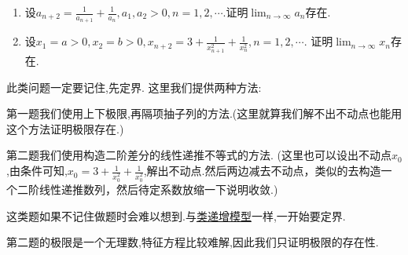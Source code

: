 \documentclass[../../main.tex]{subfiles}
\begin{document}
\begin{example}[类递减模型]\label{example:类递减模型}
\begin{enumerate}
\item 设\(a_{n + 2} = \frac{1}{a_{n + 1}} + \frac{1}{a_{n}}, a_{1}, a_{2} > 0, n = 1,2,\cdots\).证明\(\lim_{n \to \infty} a_{n}\)存在.

\item 设\(x_{1} = a>0, x_{2} = b>0, x_{n + 2} = 3 + \frac{1}{x_{n + 1}^{2}} + \frac{1}{x_{n}^{2}}, n = 1,2,\cdots\).
证明\(\lim_{n \to \infty} x_{n}\)存在.
\end{enumerate}   
\end{example}
\begin{note}
此类问题一定要记住,先定界.
这里我们提供两种方法:

第一题我们使用上下极限,再隔项抽子列的方法.(这里就算我们解不出不动点也能用这个方法证明极限存在.)

第二题我们使用构造二阶差分的线性递推不等式的方法.
(这里也可以设出不动点$x_0$,由条件可知,$x_0=3+\frac{1}{x_0^2}+\frac{1}{x_0^2}$,解出不动点.然后两边减去不动点，类似的去构造一个二阶线性递推数列，然后待定系数放缩一下说明收敛.)

这类题如果不记住做题时会难以想到.与\hyperref[example:类递增模型]{类递增模型}一样,一开始要定界.
\end{note}
\begin{remark}
第二题的极限是一个无理数,特征方程比较难解,因此我们只证明极限的存在性.
\end{remark}
\end{document}
